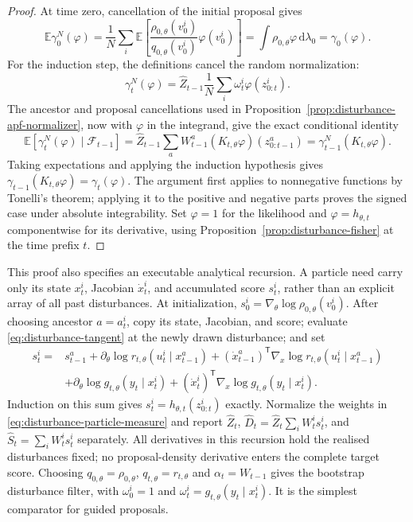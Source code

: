 \documentclass[11pt]{article}
\newcommand{\dd}{\mathrm{d}}
\begin{document}
\begin{proof}
At time zero, cancellation of the initial proposal gives
\[
 \mathbb E\gamma_0^N(\varphi)
 =\frac1N\sum_i\mathbb E\left[
       \frac{\rho_{0,\theta}(v_0^i)}{q_{0,\theta}(v_0^i)}
       \varphi(v_0^i)\right]
 =\int\rho_{0,\theta}\varphi\,\dd\lambda_0=\gamma_0(\varphi).
\]
For the induction step, the definitions cancel the random normalization:
\[
 \gamma_t^N(\varphi)
 =\widehat Z_{t-1}\frac1N\sum_i\omega_t^i\varphi(z_{0:t}^i).
\]
The ancestor and proposal cancellations used in
Proposition~\ref{prop:disturbance-apf-normalizer}, now with $\varphi$ in
the integrand, give the exact conditional identity
\begin{equation}
 \mathbb E[\gamma_t^N(\varphi)\mid\mathcal F_{t-1}]
 =\widehat Z_{t-1}\sum_aW_{t-1}^a
       (K_{t,\theta}\varphi)(z_{0:t-1}^a)
 =\gamma_{t-1}^N(K_{t,\theta}\varphi).
 \label{eq:disturbance-particle-induction-step}
\end{equation}
Taking expectations and applying the induction hypothesis gives
$\gamma_{t-1}(K_{t,\theta}\varphi)=\gamma_t(\varphi)$.
The argument first applies to nonnegative functions by Tonelli's theorem;
applying it to the positive and negative parts proves the signed case under
absolute integrability. Set $\varphi=1$ for the likelihood and
$\varphi=h_{\theta,t}$ componentwise for its derivative, using
Proposition~\ref{prop:disturbance-fisher} at the time prefix $t$.
\end{proof}

This proof also specifies an executable analytical recursion. A particle
need carry only its state $x_t^i$, Jacobian $\dot x_t^i$, and accumulated
score $s_t^i$, rather than an explicit array of all past disturbances.
At initialization, $s_0^i=\nabla_\theta\log\rho_{0,\theta}(v_0^i)$.
After choosing ancestor $a=a_t^i$, copy its state, Jacobian, and score;
evaluate \eqref{eq:disturbance-tangent} at the newly drawn disturbance; and
set
\begin{align}
 s_t^i={}&s_{t-1}^a
 +\partial_\theta\log r_{t,\theta}(u_t^i\mid x_{t-1}^a)
 +(\dot x_{t-1}^a)^{\mathsf T}
          \nabla_x\log r_{t,\theta}(u_t^i\mid x_{t-1}^a)
 \nonumber\\
 &+\partial_\theta\log g_{t,\theta}(y_t\mid x_t^i)
 +(\dot x_t^i)^{\mathsf T}\nabla_x\log g_{t,\theta}(y_t\mid x_t^i).
 \label{eq:disturbance-analytical-score-recursion}
\end{align}
Induction on this sum gives $s_t^i=h_{\theta,t}(z_{0:t}^i)$ exactly.
Normalize the weights in \eqref{eq:disturbance-particle-measure} and report
$\widehat Z_t$, $\widehat D_t=\widehat Z_t\sum_iW_t^i s_t^i$, and
$\widehat S_t=\sum_iW_t^i s_t^i$ separately. All derivatives in this
recursion hold the realised disturbances fixed; no proposal-density
derivative enters the complete target score. Choosing
$q_{0,\theta}=\rho_{0,\theta}$, $q_{t,\theta}=r_{t,\theta}$ and
$\alpha_t=W_{t-1}$ gives the bootstrap disturbance filter, with
$\omega_0^i=1$ and $\omega_t^i=g_{t,\theta}(y_t\mid x_t^i)$.
It is the simplest comparator for guided proposals.
\end{document}
